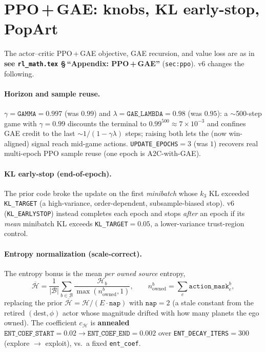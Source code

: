 \documentclass[11pt]{article}
\newcommand{\cd}[1]{\texttt{#1}}
\newcommand{\rlref}[2]{\textbf{see \texttt{rl\_math.tex} \S\,``#1''} (\texttt{#2})}
\begin{document}
\section{PPO\,+\,GAE: knobs, KL early-stop, PopArt}\label{v6:ppo}
The actor--critic PPO\,+\,GAE objective, GAE recursion, and value loss are as in
\rlref{Appendix: PPO\,+\,GAE}{sec:ppo}. v6 changes the following.

\paragraph{Horizon and sample reuse.} $\gamma=\cd{GAMMA}=0.997$ (was $0.99$) and
$\lambda=\cd{GAE\_LAMBDA}=0.98$ (was $0.95$): a $\sim$500-step game with $\gamma{=}0.99$ discounts the
terminal to $0.99^{500}\!\approx\!7\!\times\!10^{-3}$ and confines GAE credit to the last
$\sim\!1/(1{-}\gamma\lambda)$ steps; raising both lets the (now win-aligned) signal reach mid-game
actions. \cd{UPDATE\_EPOCHS}$=3$ (was $1$) recovers real multi-epoch PPO sample reuse (one epoch is
A2C-with-GAE).

\paragraph{KL early-stop (end-of-epoch).} The prior code broke the update on the first \emph{minibatch}
whose $k_3$ KL exceeded \cd{KL\_TARGET} (a high-variance, order-dependent, subsample-biased stop). v6
(\cd{KL\_EARLYSTOP}) instead completes each epoch and stops \emph{after} an epoch if its \emph{mean}
minibatch KL exceeds \cd{KL\_TARGET}$=0.05$, a lower-variance trust-region control.

\paragraph{Entropy normalization (scale-correct).} The entropy bonus is the mean \emph{per owned source}
entropy,
\begin{equation}
\overline{\mathcal H}=\frac1{|\mathcal B|}\sum_{b\in\mathcal B}\frac{\mathcal H_b}{\max(n^{b}_{\mathrm{owned}},1)},
\qquad n^{b}_{\mathrm{owned}}=\textstyle\sum_e \cd{action\_mask}^{b}_e ,
\end{equation}
replacing the prior $\overline{\mathcal H}=\mathcal H/(E\cdot\cd{nap})$ with $\cd{nap}{=}2$ (a stale
constant from the retired $(\text{dest},\phi)$ actor whose magnitude drifted with how many planets the
ego owned). The coefficient $c_{\mathcal H}$ is \textbf{annealed} $\cd{ENT\_COEF\_START}=0.02\to
\cd{ENT\_COEF\_END}=0.002$ over \cd{ENT\_DECAY\_ITERS}$=300$ (explore $\to$ exploit), vs.\ a fixed
\cd{ent\_coef}.
\end{document}
